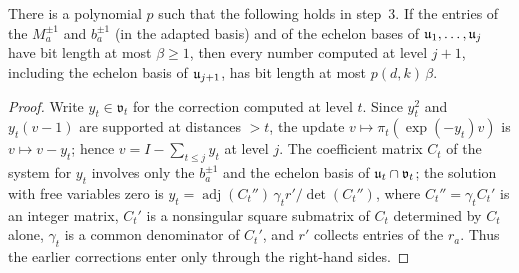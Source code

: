 \begin{lemma}\label{lem:sizes}
There is a polynomial $p$ such that the following holds in step~3. If the entries of the $M_a^{\pm1}$
and $b_a^{\pm1}$ (in the adapted basis) and of the echelon bases of $\mathfrak{u}_1,\ldots,\mathfrak{u}_j$ have bit length
at most $\beta\ge1$, then every number computed at level $j+1$, including the echelon basis of
$\mathfrak{u}_{j+1}$, has bit length at most $p(d,k)\,\beta$.
\end{lemma}
\begin{proof}
Write $y_t\in\mathfrak v_t$ for the correction computed at level $t$. Since $y_t^2$ and
$y_t(v-1)$ are supported at distances $>t$, the update $v\mapsto\pi_t(\exp(-y_t)v)$ is
$v\mapsto v-y_t$; hence $v=I-\sum_{t\le j}y_t$ at level $j$. The coefficient matrix $C_t$ of the
system for $y_t$ involves only the $b_a^{\pm1}$ and the echelon basis of $\mathfrak{u}_t\cap\mathfrak v_t$; the
solution with free variables zero is $y_t=\operatorname{adj}(C_t'')\,\gamma_tr'/\det(C_t'')$, where
$C_t''=\gamma_tC_t'$ is an integer matrix, $C_t'$ is a nonsingular square submatrix of $C_t$ determined
by $C_t$ alone, $\gamma_t$ is a common denominator of $C_t'$, and $r'$ collects entries of the $r_a$.
Thus the earlier corrections enter only through the right-hand sides.


\end{proof}
